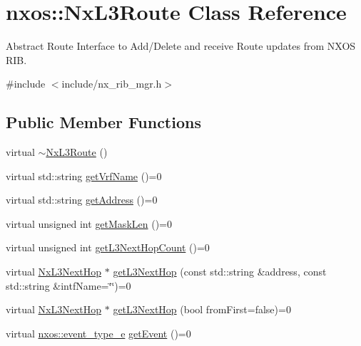 \hypertarget{classnxos_1_1_nx_l3_route}{}\section{nxos\+:\+:Nx\+L3\+Route Class Reference}
\label{classnxos_1_1_nx_l3_route}


Abstract Route Interface to Add/\+Delete and receive Route updates from N\+X\+OS R\+IB.  




{\ttfamily \#include $<$include/nx\+\_\+rib\+\_\+mgr.\+h$>$}

\subsection*{Public Member Functions}
\begin{DoxyCompactItemize}
\item 
virtual \mbox{\hyperlink{classnxos_1_1_nx_l3_route_abb3762fb6629ba1900e877555cbb69dc}{$\sim$\+Nx\+L3\+Route}} ()
\item 
virtual std\+::string \mbox{\hyperlink{classnxos_1_1_nx_l3_route_a06ed660337e8b919dd801267957497d7}{get\+Vrf\+Name}} ()=0
\item 
virtual std\+::string \mbox{\hyperlink{classnxos_1_1_nx_l3_route_a3176245539589bf745ce1d196975b3c9}{get\+Address}} ()=0
\item 
virtual unsigned int \mbox{\hyperlink{classnxos_1_1_nx_l3_route_aaafa1d34e62297bbed574995ff48dba9}{get\+Mask\+Len}} ()=0
\item 
virtual unsigned int \mbox{\hyperlink{classnxos_1_1_nx_l3_route_a5e402096d7ff280b6f4d334b3bd954d4}{get\+L3\+Next\+Hop\+Count}} ()=0
\item 
virtual \mbox{\hyperlink{classnxos_1_1_nx_l3_next_hop}{Nx\+L3\+Next\+Hop}} $\ast$ \mbox{\hyperlink{classnxos_1_1_nx_l3_route_a79bd39e19c238b12f0af22d2781059cd}{get\+L3\+Next\+Hop}} (const std\+::string \&address, const std\+::string \&intf\+Name=\char`\"{}\char`\"{})=0
\item 
virtual \mbox{\hyperlink{classnxos_1_1_nx_l3_next_hop}{Nx\+L3\+Next\+Hop}} $\ast$ \mbox{\hyperlink{classnxos_1_1_nx_l3_route_a7877c5328b1706acbbe5d8dbc6c94f4e}{get\+L3\+Next\+Hop}} (bool from\+First=false)=0
\item 
virtual \mbox{\hyperlink{nx__common_8h_af9a9040b7681199d386e94eb888018cb}{nxos\+::event\+\_\+type\+\_\+e}} \mbox{\hyperlink{classnxos_1_1_nx_l3_route_a9ca0b236a35cc616753e09e620b6b02f}{get\+Event}} ()=0
\item 

\end{DoxyCompactItemize}
